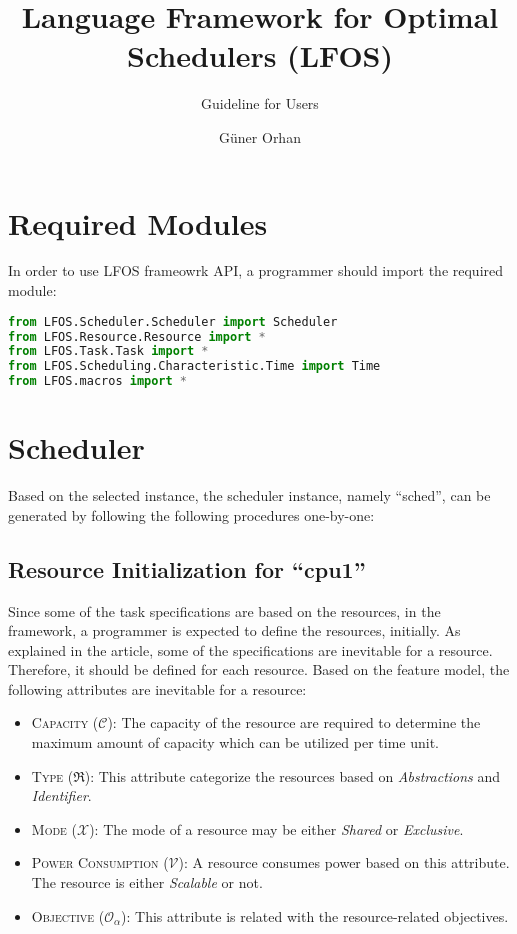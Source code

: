 \documentclass[]{scrartcl}
\title{Language Framework for Optimal Schedulers (LFOS)}
\subtitle{Guideline for Users}
\author{G\"{u}ner Orhan}
\begin{document}
\maketitle
    
\section{Required Modules}
In order to use LFOS frameowrk API, a programmer should import the required module:

\begin{lstlisting}[language=Python, frame=single, label={lst:moduleImport}, caption={Importing required modules}]
from LFOS.Scheduler.Scheduler import Scheduler
from LFOS.Resource.Resource import *
from LFOS.Task.Task import *
from LFOS.Scheduling.Characteristic.Time import Time
from LFOS.macros import *
\end{lstlisting}
        

\section{Scheduler}
Based on the selected instance, the scheduler instance, namely ``\textsf{sched}'', can be generated by following the following procedures one-by-one:
        
\subsection{Resource Initialization for ``\textsf{cpu1}''}
        
Since some of the task specifications are based on the resources, in the framework, a programmer is expected to define the resources, initially.
As explained in the article, some of the specifications are inevitable for a resource. Therefore, it should be defined for each resource.
Based on the feature model, the following attributes are inevitable for a resource:
\begin{itemize}
    \item \textsc{Capacity} ($\mathcal{C}$): The capacity of the resource are required to determine the maximum amount of capacity which can be utilized
    per time unit.
    \item \textsc{Type} ($\Re$): This attribute categorize the resources based on \emph{Abstractions} and \emph{Identifier}.
    \item \textsc{Mode} ($\mathcal{X}$): The mode of a resource may be either \emph{Shared} or \emph{Exclusive}.
    \item \textsc{Power Consumption} ($\mathcal{V}$): A resource consumes power based on this attribute. The resource is either \emph{Scalable} or not.
    \item \textsc{Objective} ($\mathcal{O}_\alpha$): This attribute is related with the resource-related objectives.
\end{itemize}
\end{document}
